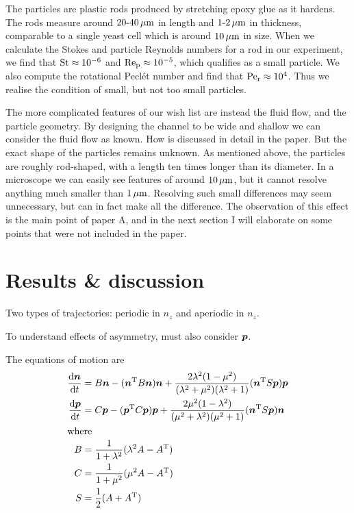 \documentclass[thesis.tex]{subfiles}
\begin{document}
The particles are plastic rods produced by stretching epoxy glue as it hardens. The rods measure around $\unit[20\textrm{-}40]{\mu m}$ in length and $\unit[1\textrm{-}2]{\mu m}$ in thickness, comparable to a single yeast cell which is around $\unit[10]{\mu m}$ in size. When we calculate the Stokes and particle Reynolds numbers for a rod in our experiment, we find that $\mbox{St} \approx 10^{-6}$ and $\mbox{Re}_{\mathrm p} \approx 10^{-5}$, which qualifies as a small particle. We also compute the rotational Pecl\'et number and find that $\mbox{Pe}_{\mathrm r}\approx10^{4}$. Thus we realise the condition of small, but not too small particles. 

The more complicated features of our wish list are instead the fluid flow, and the particle geometry. By designing the channel to be wide and shallow we can consider the fluid flow as known. How is discussed in detail in the paper. But the exact shape of the particles remains unknown. As mentioned above, the particles are roughly rod-shaped, with a length ten times longer than its diameter. In a microscope we can easily see features of around $\unit[10]{\mu m}$, but it cannot resolve anything much smaller than $\unit[1]{\mu m}$. Resolving such small differences may seem unnecessary, but can in fact make all the difference. The observation of this effect is the main point of paper A, and in the next section I will elaborate on some points that were not included in the paper.

\section{Results \& discussion}

Two types of trajectories: periodic in $n_z$ and aperiodic in $n_z$.

To understand effects of asymmetry, must also consider $\mbox{\boldmath$p$}$.

The equations of motion are
\begin{align*}
	\frac{\mathrm{d} \mbox{\boldmath$n$}}{\mathrm{d} t} &= B \mbox{\boldmath$n$} - (\mbox{\boldmath$n$}^{\mathrm T} B \mbox{\boldmath$n$})\mbox{\boldmath$n$} + \frac{ 2\lambda^2 (1 - \mu^2) }{(\lambda^2+\mu^2)(\lambda^2+1)}(\mbox{\boldmath$n$}^{\mathrm T} S \mbox{\boldmath$p$})\mbox{\boldmath$p$} \\
	\frac{\mathrm{d} \mbox{\boldmath$p$}}{\mathrm{d} t} &= C \mbox{\boldmath$p$} - (\mbox{\boldmath$p$}^{\mathrm T} C \mbox{\boldmath$p$})\mbox{\boldmath$p$} + \frac{ 2\mu^2 (1 - \lambda^2) }{(\mu^2+\lambda^2)(\mu^2+1)}(\mbox{\boldmath$n$}^{\mathrm T} S \mbox{\boldmath$p$})\mbox{\boldmath$n$} \\
	\intertext{where}
	B &= \frac{1}{1+\lambda^2}(\lambda^2 A - A^{\mathrm T}) \\
	C &= \frac{1}{1+\mu^2}(\mu^2 A - A^{\mathrm T}) \\
	S &= \frac{1}{2}(A + A^{\mathrm T})
\end{align*}
\end{document}
